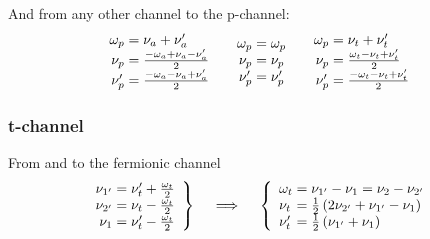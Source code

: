 \documentclass[12pt,a4paper,roman]{article}
\begin{document}
And from any other channel to the p-channel:
\begin{align}
    \begin{array}{r@{\mskip\thickmuskip}l}
    \omega_p &= \nu_a+\nu'_a\\
    \nu_p  &= \frac{-\omega_a+\nu_a-\nu'_a}{2}\\
    \nu'_p &= \frac{-\omega_a-\nu_a+\nu'_a}{2}\\
  \end{array}
  \quad  \begin{array}{r@{\mskip\thickmuskip}l}
    \omega_p &= \omega_p\\
    \nu_p  &= \nu_p \\
    \nu'_p &= \nu'_p\\
  \end{array} \quad
  \begin{array}{r@{\mskip\thickmuskip}l}
    \omega_p &= \nu_t+\nu'_t\\
    \nu_p &= \frac{ \omega_t-\nu_t+\nu'_t}{2}\\
    \nu'_p &= \frac{-\omega_t-\nu_t+\nu'_t}{2}\\
  \end{array}
\end{align}

\subsubsection*{t-channel}
From and to the fermionic channel
\begin{align}
    \left.\begin{array}{r@{\mskip\thickmuskip}l}
    \nu_{1'} &= \nu'_t + \frac{\omega_t}{2} \\
    \nu_{2'} &= \nu_t  - \frac{\omega_t}{2} \\
    \nu_{1 } &= \nu'_t - \frac{\omega_t}{2} \\
  \end{array} \right\}
  \quad \implies \quad
  \left\{\begin{array}{l@{\mskip\thickmuskip}l}
    \omega_t &= \nu_{1'} - \nu_{1} = \nu_{2} - \nu_{2'}\\
    \nu_t    &= \frac{1}{2}\left(2\nu_{2'}+\nu_{1'}-\nu_{1}\right) \\
    \nu'_t   &= \frac{1}{2}\left(\nu_{1'} +\nu_{1}\right)\\
  \end{array}\right.
\end{align}
\end{document}
